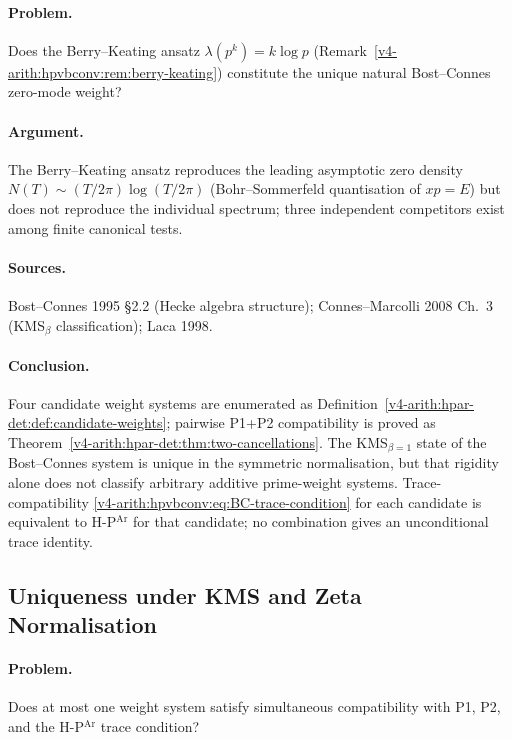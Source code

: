 \paragraph{Problem.} Does the Berry--Keating ansatz
\(\lambda(p^{k})=k\log p\)
(Remark~\ref{v4-arith:hpvbconv:rem:berry-keating}) constitute the unique
natural Bost--Connes zero-mode weight?

\paragraph{Argument.} The Berry--Keating ansatz reproduces the
leading asymptotic zero density \(N(T)\sim(T/2\pi)\log(T/2\pi)\)
(Bohr--Sommerfeld quantisation of \(xp=E\)) but does not reproduce the
individual spectrum; three independent competitors exist among finite
canonical tests.

\paragraph{Sources.} Bost--Connes 1995 \S2.2 (Hecke algebra
structure); Connes--Marcolli 2008 Ch.~3 (KMS\({}_{\beta}\)
classification); Laca 1998.

\paragraph{Conclusion.} Four candidate weight systems are enumerated as
Definition~\ref{v4-arith:hpar-det:def:candidate-weights}; pairwise
P1+P2 compatibility is proved as
Theorem~\ref{v4-arith:hpar-det:thm:two-cancellations}. The KMS\({}_{\beta=1}\) state of the
Bost--Connes system is unique in the symmetric normalisation, but that
rigidity alone does not classify arbitrary additive prime-weight
systems. Trace-compatibility
\eqref{v4-arith:hpvbconv:eq:BC-trace-condition} for each candidate
is equivalent to H-P\(^{\mathrm{Ar}}\) for that candidate; no
combination gives an unconditional trace identity.

\subsection{Uniqueness under KMS and Zeta Normalisation}
\label{v4-arith:hpar-det:cycle-2}

\paragraph{Problem.} Does at most one weight system satisfy
simultaneous compatibility with P1, P2, and the
H-P\(^{\mathrm{Ar}}\) trace condition?


